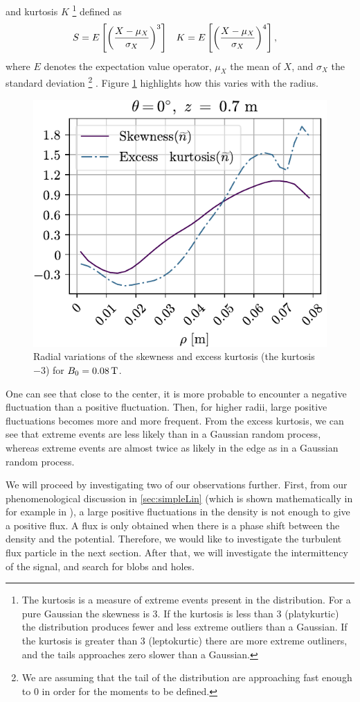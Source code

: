 %
and kurtosis $K$
%
\footnote{
    The kurtosis is a measure of extreme events present in the distribution.
    For a pure Gaussian the skewness is 3.
    If the kurtosis is less than 3 (platykurtic) the distribution produces fewer and less extreme outliers than a Gaussian.
    If the kurtosis is greater than 3 (leptokurtic) there are more extreme outliners, and the tails approaches zero slower than a Gaussian.
}
%
defined as
%
\begin{align*}
    &S=E\left[\left(\frac{X - \mu_X}{\sigma_X}\right)^3\right]&
    &K=E\left[\left(\frac{X - \mu_X}{\sigma_X}\right)^4\right],
\end{align*}
%
where $E$ denotes the expectation value operator, $\mu_X$ the mean of $X$, and $\sigma_X$ the standard deviation%
\footnote{We are assuming that the tail of the distribution are approaching fast enough to $0$ in order for the moments to be defined.}
.
Figure \cref{fig:skewKurt008} highlights how this varies with the radius.
%
\begin{figure}[htb]
    \centering
    \includegraphics{fig/results/skewKurt/008T}
    \caption{Radial variations of the skewness and excess kurtosis (the kurtosis $-3$) for $B_0 = 0.08\, \text{T}$.}
    \label{fig:skewKurt008}
\end{figure}
%

One can see that close to the center, it is more probable to encounter a negative fluctuation than a positive fluctuation.
Then, for higher radii, large positive fluctuations becomes more and more frequent.
From the excess kurtosis, we can see that extreme events are less likely than in a Gaussian random process, whereas extreme events are almost twice as likely in the edge as in a Gaussian random process.

We will proceed by investigating two of our observations further.
First, from our phenomenological discussion in \cref{sec:simpleLin} (which is shown mathematically in for example in \cite{Garcia2001a}), a large positive fluctuations in the density is not enough to give a positive flux.
A flux is only obtained when there is a phase shift between the density and the potential.
Therefore, we would like to investigate the turbulent flux particle in the next section.
After that, we will investigate the intermittency of the signal, and search for blobs and holes.
